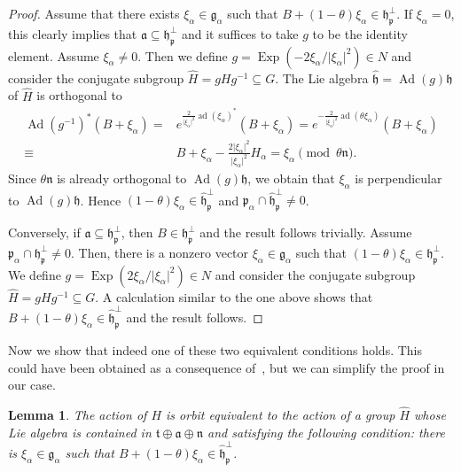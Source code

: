 \documentclass[12pt, a4paper]{amsart}
\newcommand{\g}{\mathfrak}
\newcommand{\ad}{\operatorname{ad}}
\newcommand{\Ad}{\operatorname{Ad}}
\newcommand{\Exp}{\operatorname{Exp}}
\newtheorem{lemma}[theorem]{Lemma}
\theoremstyle{definition}
\begin{document}
\begin{proof}
Assume that there exists $\xi_\alpha\in\g{g}_\alpha$ such that $B+(1-\theta)\xi_\alpha\in\g{h}_\g{p}^\perp$.
If $\xi_\alpha=0$, this clearly implies that $\g{a}\subseteq\g{h}_\g{p}^\perp$ and it suffices to take $g$ to be the identity element.
Assume $\xi_\alpha\neq 0$.
Then we define $g=\Exp(-2\xi_\alpha/\lvert\xi_\alpha\rvert^2)\in N$ and consider the conjugate subgroup 
$\hat{H}=gHg^{-1}\subseteq {G}$.
The Lie algebra 
$\hat{\g{h}}=\Ad(g)\g{h}$ of $\hat{H}$ is orthogonal to
\begin{align*}
\Ad(g^{-1})^*(B+\xi_\alpha)={}
&e^{\frac{2}{\lvert\xi_\alpha\rvert^2}\ad(\xi_\alpha)^*}(B+\xi_\alpha)
=e^{-\frac{2}{\lvert\xi_\alpha\rvert^2}\ad(\theta\xi_\alpha)}(B+\xi_\alpha) \\
\equiv{}& B+\xi_\alpha-\frac{2\lvert\xi_\alpha\rvert^2}{\lvert\xi_\alpha\rvert^2}H_\alpha=\xi_\alpha \pmod{\theta\g{n}}.
\end{align*}
Since $\theta\g{n}$ is already orthogonal to $\Ad(g)\g{h}$, we obtain that $\xi_\alpha$ is perpendicular to $\Ad(g)\g{h}$.
Hence $(1-\theta)\xi_\alpha\in\hat{\g{h}}_\g{p}^\perp$ and $\g{p}_\alpha\cap\hat{\g{h}}_{\g{p}}^\perp\neq 0$.

Conversely, if $\g{a}\subseteq\g{h}_\g{p}^\perp$, then $B\in\g{h}_\g{p}^\perp$ and the result follows trivially.
Assume $\g{p}_\alpha\cap\g{h}_\g{p}^\perp\neq 0$. 
Then, there is a nonzero vector $\xi_\alpha\in\g{g}_\alpha$ such that $(1-\theta)\xi_\alpha\in\g{h}_\g{p}^\perp$.
We define $g=\Exp(2\xi_\alpha/\lvert\xi_\alpha\rvert^2)\in N$ and consider the conjugate subgroup $\hat{H}=g{H}g^{-1}\subseteq {G}$.
A calculation similar to the one above shows that $B+(1-\theta)\xi_\alpha\in\hat{\g{h}}_\g{p}^\perp$ and the result follows.
\end{proof}

Now we show that indeed one of these two equivalent conditions holds.
This could have been obtained as a consequence of~\cite[Lemma~4.4]{DiazLorenzo}, 
but we can simplify the proof in our case.

\begin{lemma}\label{lemma:B+galpha}
    The action of $H$ is orbit equivalent to the action of a group $\hat{H}$ whose Lie algebra is contained in $\g{t}\oplus\g{a}\oplus\g{n}$ and satisfying the following condition: there is $\xi_\alpha\in\g{g}_\alpha$ such that $B+(1-\theta)\xi_\alpha\in\hat{\g{h}}_\g{p}^\perp$.
\end{lemma}
\end{document}
